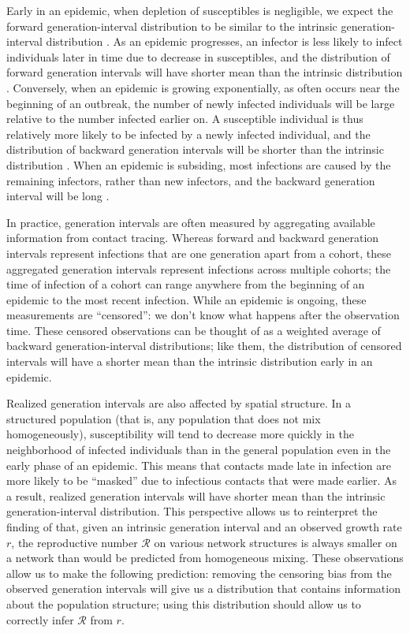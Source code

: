 \documentclass[12pt]{article}
\newcommand{\RR}{\ensuremath{{\mathcal R}}}
\begin{document}
Early in an epidemic, when depletion of susceptibles is negligible, we expect the forward generation-interval distribution to be similar to the intrinsic generation-interval distribution \citep{champredon2015intrinsic}.
As an epidemic progresses, an infector is less likely to infect individuals later in time due to decrease in susceptibles, 
and the distribution of forward generation intervals will have shorter mean than the intrinsic distribution \citep{kenah2008generation, tomba2010some, champredon2015intrinsic}.
Conversely, when an epidemic is growing exponentially, as often occurs near the beginning of an outbreak, the number of newly infected individuals will be large relative to the number infected earlier on. 
A susceptible individual is thus relatively more likely to be infected by a newly infected individual, 
and the distribution of backward generation intervals will be shorter than the intrinsic distribution \citep{champredon2015intrinsic, britton2019estimation}.
When an epidemic is subsiding, most infections are caused by the remaining infectors, rather than new infectors, and the backward generation interval will be long \citep{tomba2010some, champredon2015intrinsic}.

In practice, generation intervals are often measured by aggregating available information from contact tracing. 
Whereas forward and backward generation intervals represent infections that are one generation apart from a cohort, these aggregated generation intervals represent infections across multiple cohorts; 
the time of infection of a cohort can range anywhere from the beginning of an epidemic to the most recent infection.
While an epidemic is ongoing, these measurements are ``censored'': we don't know what happens after the observation time.
These censored observations can be thought of as a weighted average of backward generation-interval distributions;
like them, the distribution of censored intervals will have a shorter mean than the intrinsic distribution early in an epidemic.

Realized generation intervals are also affected by spatial structure.
In a structured population (that is, any population that does not mix homogeneously), susceptibility will tend to decrease more quickly in the neighborhood of infected individuals than in the general population even in the early phase of an epidemic. 
This means that contacts made late in infection are more likely to be ``masked'' due to infectious contacts that were made earlier.
As a result, realized generation intervals will have shorter mean than the intrinsic generation-interval distribution.
This perspective allows us to reinterpret the finding of \cite{trapman2016inferring} that, given an intrinsic generation interval and an observed growth rate $r$, the reproductive number $\RR$ on various network structures is always smaller on a network than would be predicted from homogeneous mixing.
These observations allow us to make the following prediction: removing the censoring bias from the observed generation intervals will give us a distribution that contains information about the population structure; using this distribution should allow us to correctly infer $\RR$ from $r$.
\end{document}
